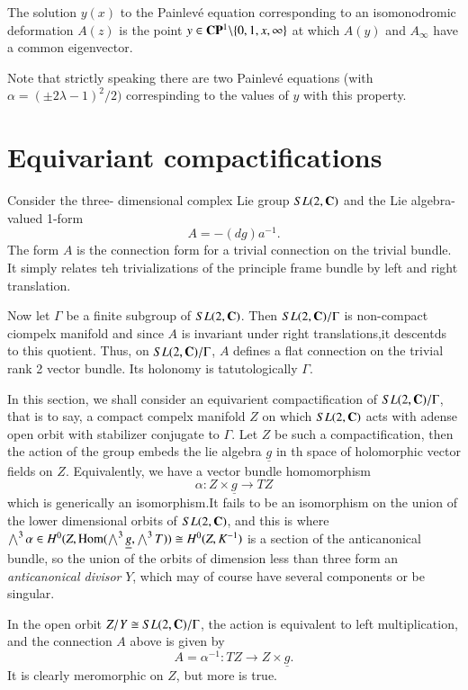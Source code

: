 \begin{proposition}\label{art7-proposition-1}
The solution $y(x)$ to the Painlev\'e equation corresponding to an isomonodromic deformation $A(z)$ is the point $y \in \bC\bP^{1} \backslash \{ 0,1,\break x, \infty\}$ at which $A(y)$ and $A_{\infty}$ have a common eigenvector.
\end{proposition}

Note that strictly speaking there are two Painlev\'e equations (with $\alpha = (\pm 2\lambda -1)^{2}/2)$ correspinding to the values of $y$ with this property.

\section{Equivariant compactifications}\label{art7-sec-3}

Consider the three- dimensional complex Lie group $SL(2, \mathbf{C})$ and the Lie algebra-valued 1-form
$$
A = -(dg)a^{-1}.
$$
The form $A$ is the connection form for a trivial connection on the trivial bundle. It simply relates teh trivializations of the principle frame bundle by left and right translation.

Now let $\Gamma$ be a finite subgroup of $SL(2, \mathbf{C})$. Then $SL(2, \mathbf{C})/\Gamma$ is non-compact ciompelx manifold and since $A$ is invariant under right translations,it descentds to this quotient. Thus, on $SL(2, \mathbf{C})/\Gamma$, $A$ defines a flat connection on the trivial rank 2 vector bundle. Its holonomy is tatutologically $\Gamma$.

In this section, we shall consider an equivarient compactification of $SL(2, \mathbf{C})/\Gamma$,  that is to say, a compact compelx manifold $Z$ on which $SL(2, \mathbf{C})$ acts with a\pageoriginale dense open orbit with stabilizer conjugate to $\Gamma$. Let $Z$ be such a compactification, then the action of the group embeds the lie algebra $\underline{g}$  in th space of holomorphic vector fields on $Z$. Equivalently, we have a vector bundle homomorphism
$$
\alpha: Z \times \underline{g} \rightarrow TZ
$$
which is generically an isomorphism.It fails to be an isomorphism on the union of the lower dimensional orbits of $SL(2, \mathbf{C})$, and this is where $\bigwedge^{3} \alpha \in H^{0}(Z, \operatorname{Hom}(\bigwedge^{3} \underline{g}, \bigwedge^{3}T)) \cong H^{0}(Z, K^{-1})$ is a section of the anticanonical bundle, so the union of the orbits of dimension less than three form an \textit{anticanonical divisor} $Y$, which may of course have several components or be singular.

 In the open orbit $Z/Y \cong SL(2, \mathbf{C})/\Gamma$, the action is equivalent to left multiplication, and the connection $A$ above is given by
 $$
 A = \alpha^{-1}: TZ \rightarrow  Z \times \underline{g}.
 $$
It is clearly meromorphic on $Z$, but more is true.

